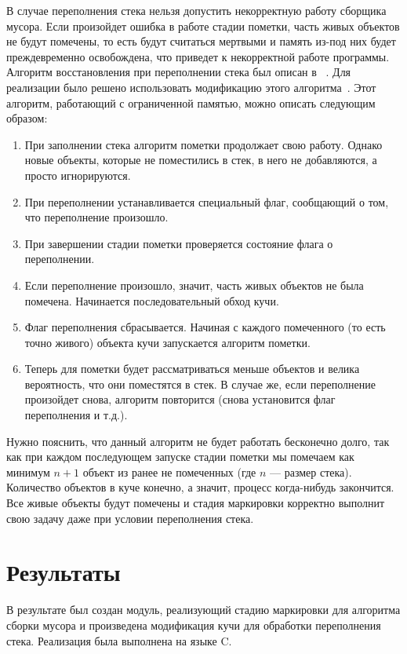 В случае переполнения стека нельзя допустить некорректную работу сборщика мусора. Если произойдет ошибка в работе стадии пометки, часть живых 
объектов не будут помечены, то есть будут считаться мертвыми и память из-под них будет преждевременно освобождена, что приведет к 
некорректной работе программы. Алгоритм восстановления при переполнении стека был описан в ~\cite{knuth}. Для реализации было решено использовать модификацию 
этого алгоритма~\cite{pliss}. Этот алгоритм, работающий с ограниченной памятью, можно описать следующим образом:

\begin{enumerate}
   \item При заполнении стека алгоритм пометки продолжает свою работу. Однако новые объекты, которые не поместились в стек, в него не добавляются,
   а просто игнорируются.
   \item При переполнении устанавливается специальный флаг, сообщающий о том, что переполнение произошло.
   \item При завершении стадии пометки проверяется состояние флага о переполнении.
   \item Если переполнение произошло, значит, часть живых объектов не была помечена. Начинается последовательный обход кучи.
   \item Флаг переполнения сбрасывается. Начиная с каждого помеченного (то есть точно живого) объекта кучи запускается алгоритм пометки.
   \item Теперь для пометки будет рассматриваться меньше объектов и велика вероятность, что они поместятся в стек. В случае же, если переполнение 
   произойдет снова, алгоритм повторится (снова установится флаг переполнения и т.д.).
\end{enumerate}

Нужно пояснить, что данный алгоритм не будет работать бесконечно долго, так как при каждом последующем запуске стадии пометки мы помечаем 
как минимум $n + 1$ объект из ранее не помеченных (где $n$ --- размер стека). Количество объектов в куче конечно, а значит, процесс когда-нибудь 
закончится. Все живые объекты будут помечены и стадия маркировки корректно выполнит свою задачу даже при условии переполнения стека.

\section{Результаты}
В результате был создан модуль, реализующий стадию маркировки для алгоритма сборки мусора и произведена модификация кучи для обработки переполнения стека.
Реализация была выполнена на языке C. 

